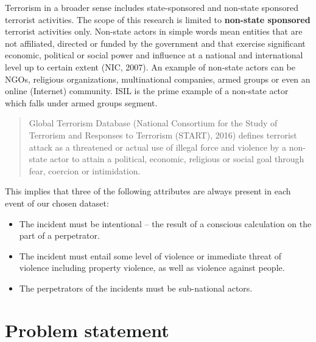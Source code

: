 \documentclass[11pt,oneside,a4paper]{reedthesis}
\providecommand{\tightlist}{%
  \setlength{\itemsep}{0pt}\setlength{\parskip}{0pt}}
\begin{document}
Terrorism in a broader sense includes state-sponsored and non-state
sponsored terrorist activities. The scope of this research is limited to
\textbf{non-state sponsored} terrorist activities only. Non-state actors
in simple words mean entities that are not affiliated, directed or
funded by the government and that exercise significant economic,
political or social power and influence at a national and international
level up to certain extent (NIC, 2007). An example of non-state actors
can be NGOs, religious organizations, multinational companies, armed
groups or even an online (Internet) community. ISIL is the prime example
of a non-state actor which falls under armed groups segment.
\begin{quote}
Global Terrorism Database (National Consortium for the Study of
Terrorism and Responses to Terrorism (START), 2016) defines terrorist
attack as a threatened or actual use of illegal force and violence by a
non-state actor to attain a political, economic, religious or social
goal through fear, coercion or intimidation.
\end{quote}
This implies that three of the following attributes are always present
in each event of our chosen dataset:
\begin{itemize}
\tightlist
\item
  The incident must be intentional -- the result of a conscious
  calculation on the part of a perpetrator.
\item
  The incident must entail some level of violence or immediate threat of
  violence including property violence, as well as violence against
  people.
\item
  The perpetrators of the incidents must be sub-national actors.
\end{itemize}
\section*{Problem statement}\label{problem-statement}
\end{document}
